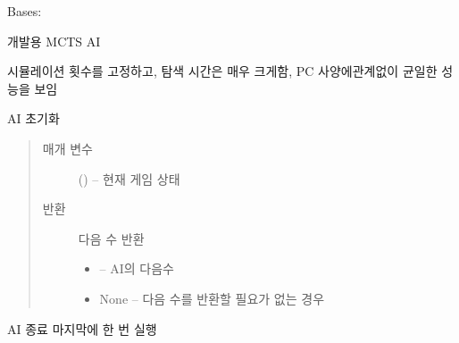 \documentclass[letterpaper,10pt,english]{sphinxmanual}
\begin{document}
\begin{fulllineitems}
\label{\detokenize{agents.search:agents.search.mcts_agent.MCTSAgentDev}}
Bases: {\hyperref[\detokenize{agents:agents.BaseAgent}]{}}

개발용 MCTS AI

시뮬레이션 횟수를 고정하고, 탐색 시간은 매우 크게함,
PC 사양에관계없이 균일한 성능을 보임

\begin{fulllineitems}
\label{\detokenize{agents.search:agents.search.mcts_agent.MCTSAgentDev.act}}
AI 초기화
\begin{quote}\begin{description}
\item[{매개 변수}] \leavevmode
{} ({\hyperref[\detokenize{scripts:scripts.run_game.State}]{}}) -- 현재 게임 상태

\item[{반환}] \leavevmode

다음 수 반환
\begin{itemize}
\item {} 
 -- AI의 다음수

\item {} 
None -- 다음 수를 반환할 필요가 없는 경우

\end{itemize}


\end{description}\end{quote}

\end{fulllineitems}


\begin{fulllineitems}
\label{\detokenize{agents.search:agents.search.mcts_agent.MCTSAgentDev.close}}
AI 종료
마지막에 한 번 실행


\end{fulllineitems}
\end{fulllineitems}
\end{document}
